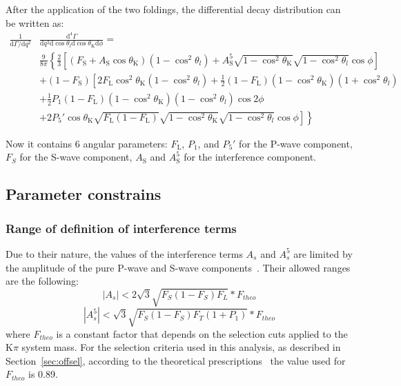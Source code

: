 After the application of the two foldings, the differential decay distribution can be written as:
\begin{equation} \label{eq:PDF-f2}
  \begin{split}
    \frac{1}{\mathrm{d}\Gamma/\mathrm{d}q^2}&\frac{\mathrm{d}^4\Gamma}{\mathrm{d}q^2 \mathrm{d}\cos\theta_l \mathrm{d}\cos\theta_\mathrm{K} \mathrm{d}\phi} = \\
    &\frac{9}{8\pi}\left\{\frac{2}{3}\left[ (F_\mathrm{S}+A_\mathrm{S}\cos\theta_\mathrm{K})\left(1-\cos^2\theta_l\right) + A^5_\mathrm{S}\sqrt{1-\cos^2\theta_\mathrm{K}}\sqrt{1-\cos^2\theta_l}\cos\phi \right] \right.\\
    & + \left(1 - F_\mathrm{S}\right)\left[2F_\mathrm{L}\cos^2\theta_\mathrm{K}\left(1-\cos^2\theta_l\right)+\frac{1}{2}\left(1-F_\mathrm{L}\right)\left(1-\cos^2\theta_\mathrm{K}\right)\left(1+\cos^2\theta_l\right) \right.\\
      & + \frac{1}{2}P_1(1-F_\mathrm{L})(1-\cos^2\theta_\mathrm{K})(1-\cos^2\theta_l)\cos 2\phi \\
      & \left.\left. + 2P_5'\cos\theta_\mathrm{K}\sqrt{F_\mathrm{L}\left(1-F_\mathrm{L}\right)}\sqrt{1-\cos^2\theta_\mathrm{K}}\sqrt{1-\cos^2\theta_l}\cos\phi\right]\right\}
  \end{split}
\end{equation}

Now it contains 6 angular parameters: $F_\mathrm{L}$, $P_1$, and $P_5'$ for the P-wave component, $F_S$ for the S-wave component, $A_\mathrm{S}$ and $A^5_\mathrm{S}$ for the interference component.

\subsection{Parameter constrains}
\label{sec:bound}

\subsubsection{Range of definition of interference terms}
\label{sec:As5.range}
Due to their nature, the values of the interference terms $A_s$ and $A_s^5$ are limited by the amplitude of the pure P-wave and S-wave components~\cite{Genon:Swave}.
Their allowed ranges are the following:
\begin{equation} \label{eq:As.range}
  |A_s|<2\sqrt{3}\sqrt{F_S(1-F_S)F_L}*F_{theo}
\end{equation}
\begin{equation} \label{eq:As5.range}
  |A^5_s|<\sqrt{3}\sqrt{F_S(1-F_S)F_T(1+P_1)}*F_{theo}
\end{equation}
where $F_{theo}$ is a constant factor that depends on the selection cuts applied to the $\mathrm{K}\pi$ system mass.
For the selection criteria used in this analysis, as described in Section~\ref{sec:offsel}, according to the theoretical prescriptions~\cite{Genon:Swave} the value used for $F_{theo}$ is 0.89.

